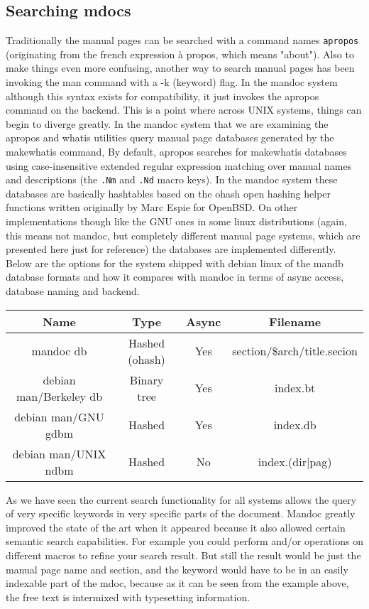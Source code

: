 \documentclass{report}
\begin{document}
\subsection*{Searching mdocs}
Traditionally the manual pages can be searched with a command names {\tt apropos} (originating from the french expression à propos, which means "about").
Also to make things even more confusing, another way to search manual pages has been invoking the man command with a -k (keyword) flag. In the mandoc 
system although this syntax exists for compatibility, it just invokes the apropos command on the backend. This is a point where across UNIX systems, 
things can begin to diverge greatly. In the mandoc system that we are examining the apropos and whatis utilities query manual page databases generated by the makewhatis command, 
By default, apropos searches for makewhatis databases using case-insensitive extended regular expression matching over manual names and descriptions (the {\tt .Nm} and {\tt .Nd} macro keys).
In the mandoc system these databases are basically hashtables based on the ohash open hashing helper functions written originally by Marc Espie for OpenBSD. On other implementations
though like the GNU ones in some linux distributions (again, this means not mandoc, but completely different manual page systems, which are presented here just for reference)
the databases are implemented differently. Below are the options for the system shipped with debian linux of the mandb database formats and how it compares with mandoc in terms of 
async access, database naming and backend.
\begin{center}
\begin{tabular}{c|c|c|c}
Name&Type&Async&Filename\\
\hline
mandoc db & Hashed (ohash) & Yes & section/\$arch/title.secion \\
debian man/Berkeley db &  Binary tree & Yes & index.bt \\
debian man/GNU gdbm & Hashed & Yes & index.db \\
debian man/UNIX ndbm & Hashed & No & index.(dir|pag)\\
\hline
\end{tabular}
\end{center}
As we have seen the current search functionality for all systems allows the query of very specific keywords in very specific parts of the document. Mandoc greatly improved
the state of the art when it appeared because it also allowed certain semantic search capabilities. For example you could perform and/or operations on different macros
to refine your search result. But still the result would be just the manual page name and section, and the keyword would have to be in an easily indexable part of the 
mdoc, because as it can be seen from the example above, the free text is intermixed with typesetting information.
\end{document}
